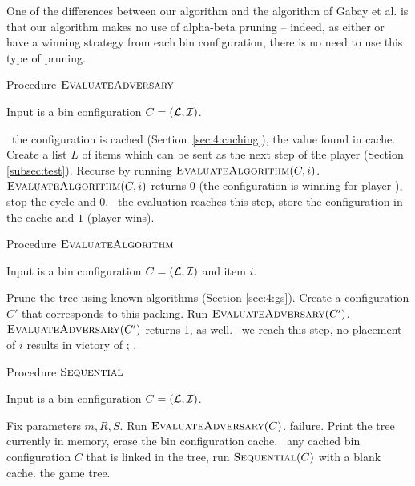 One of the differences between our algorithm and the algorithm of
Gabay et al. \cite{gabay2013lbv2} is that our algorithm makes no use
of alpha-beta pruning -- indeed, as either \algo or \adversary have a
winning strategy from each bin configuration, there is no need to use
this type of pruning.

\begin{algorithm}
\caption{Procedure $\textsc{EvaluateAdversary}$}
Input is a bin configuration $C = ({\mathcal L}, {\mathcal I})$.
\begin{algorithmic}[1]
\State \algorithmicif\ the configuration is cached (Section~\ref{sec:4:caching}), \Return the value found in cache.
\State Create a list $L$ of items which can be sent as the next step of the player \adversary (Section \ref{subsec:test}).
\State Recurse by running $\textsc{EvaluateAlgorithm}(C,i)$.
\State \algorithmicif\ $\textsc{EvaluateAlgorithm}(C,i)$ returns $0$ (the configuration is winning for player \adversary), stop the cycle and \Return $0$.
\EndFor
\State \algorithmicif\ the evaluation reaches this step, store the configuration in the cache and \Return $1$ (player \algo wins).

\end{algorithmic}
\end{algorithm}


\begin{algorithm}
\caption{Procedure $\textsc{EvaluateAlgorithm}$}
Input is a bin configuration $C = ({\mathcal L},{\mathcal I})$ and item $i$.
\begin{algorithmic}[1]
\State Prune the tree using known algorithms (Section \ref{sec:4:gs}).
\State Create a configuration $C'$ that corresponds to this packing.
\State Run $\textsc{EvaluateAdversary}(C')$.
\State \algorithmicif\ $\textsc{EvaluateAdversary}(C')$ returns 1,  as well.
\EndIf
\EndFor
\State \algorithmicif\ we reach this step, no placement of $i$ results in victory of \algo; .
\end{algorithmic}
\end{algorithm}

\begin{algorithm}
\caption{Procedure $\textsc{Sequential}$}
\noindent Input is a bin configuration $C = ({\mathcal L},{\mathcal I})$. 
\begin{algorithmic}[1]
\State Fix parameters $m,R,S$.
\State Run $\textsc{EvaluateAdversary}(C)$.
\State \Return failure.
\Else
\State Print the tree currently in memory, erase the bin configuration cache.
\State \algorithmicfor\ any cached bin configuration $C$ that is linked in the tree, run $\textsc{Sequential}(C)$ with a blank cache.
\State \Return the game tree.
\EndIf
\end{algorithmic}
\end{algorithm}

